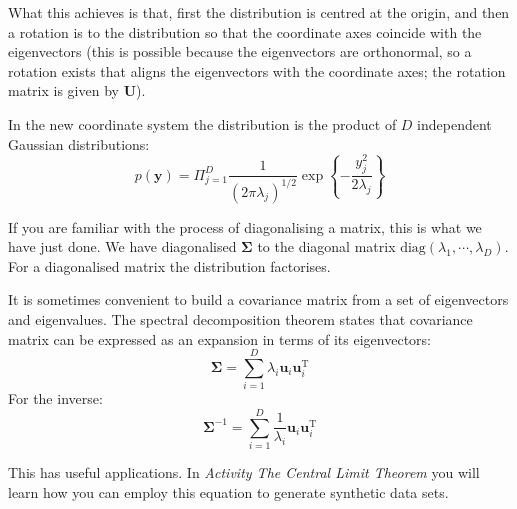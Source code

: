   What this achieves is that, first the distribution is centred at the origin, and then a rotation is to the distribution so that the coordinate axes
  coincide with the eigenvectors (this is possible because the eigenvectors are orthonormal, so a rotation exists that aligns the eigenvectors
  with the coordinate axes; the rotation matrix is given by $\boldsymbol{U}$).

  In the new coordinate system the distribution is the product of $D$ independent Gaussian distributions:
  \begin{equation}
    p(\boldsymbol{y}) = \Pi^D_{j=1} \frac{1}{(2 \pi \lambda_j)^{1/2}} \exp \left\{-\frac{y^2_j}{2 \lambda_j} \right\}
  \end{equation}

  If you are familiar with the process of diagonalising a matrix, this is what we have just done. We have diagonalised
  $\boldsymbol{\Sigma}$ to the diagonal matrix $\mbox{diag}(\lambda_1, \cdots, \lambda_D)$.  For a diagonalised matrix the distribution factorises.
  
  
 
  


  
  It is sometimes convenient to build a covariance matrix from a set of eigenvectors and eigenvalues.
  The spectral decomposition theorem states that covariance matrix can be expressed as an expansion in terms of its eigenvectors:
  \begin{equation}
    \boldsymbol{\Sigma}=\sum_{i=1}^{D} \lambda_{i} \mathbf{u}_{i} \mathbf{u}_{i}^{\mathrm{T}}
    \label{eq-spect}
  \end{equation}
  For the inverse:
    \begin{equation}
      \boldsymbol{\Sigma}^{-1}=\sum_{i=1}^{D} \frac{1}{\lambda_{i}} \mathbf{u}_{i} \mathbf{u}_{i}^{\mathrm{T}}
      \label{eq-spectinverse}
  \end{equation}

  
  This has useful applications. In \emph{Activity The Central Limit Theorem} you will learn how you can employ this equation to generate synthetic data sets.

